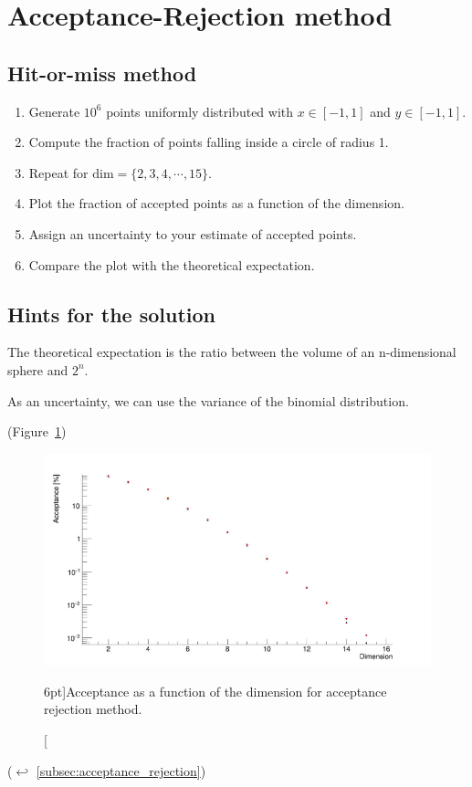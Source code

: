 

\section{Acceptance-Rejection method}
\label{exer:acceptance_rejection}

\subsection{Hit-or-miss method}

\begin{enumerate}
	\item Generate $10^{6}$ points uniformly distributed with $x \in [-1, 1]$ and $y \in [-1, 1]$.
	\item Compute the fraction of points falling inside a circle of radius 1.
	\item Repeat for $\mathrm{dim} = \{ 2, 3, 4, \cdots, 15 \}$.
	\item Plot the fraction of accepted points as a function of the dimension.
	\item Assign an uncertainty to your estimate of accepted points.
	\item Compare the plot with the theoretical expectation.
\end{enumerate}

\subsection{Hints for the solution}

The theoretical expectation is the ratio between the volume of an n-dimensional sphere and $2^{n}$.

As an uncertainty, we can use the variance of the binomial distribution.

(Figure~\ref{fig:acceptance_rejection})

\begin{figure}
	\includegraphics{exercise/acceptance_rejection_method.png}
	\caption[Acceptance as a function of the dimension.][6pt]{Acceptance as a function of the dimension for acceptance rejection method.}
	\label{fig:acceptance_rejection}
\end{figure}

($\hookleftarrow$ \ref{subsec:acceptance_rejection})
